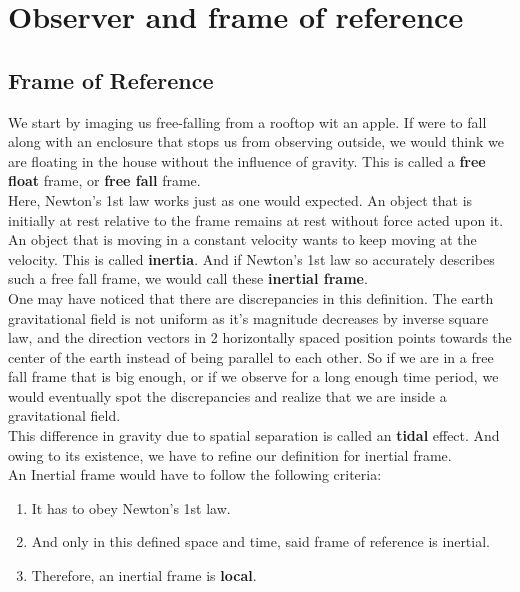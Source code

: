 \documentclass[12pt]{book}
\begin{document}
\section{Observer and frame of reference}

\subsection{Frame of Reference}
We start by imaging us free-falling from a rooftop wit an apple. If were to fall along with an enclosure that stops us from observing outside, we would think we are floating in the house without the influence of gravity. This is called a \textbf{free float} frame, or \textbf{free fall} frame.\\
\newline
Here, Newton's 1st law works just as one would expected. An object that is initially at rest relative to the frame remains at rest without force acted upon it. An object that is moving in a constant velocity wants to keep moving at the velocity. This is called \textbf{inertia}. And if Newton's 1st law so accurately describes such a free fall frame, we would call these \textbf{inertial frame}. 
\\
\newline
One may have noticed that there are discrepancies in this definition. The earth gravitational field is not uniform as it's magnitude decreases by inverse square law, and the direction vectors in 2 horizontally spaced position points towards the center of the earth instead of being parallel to each other. So if we are in a free fall frame that is big enough, or if we observe for a long enough time period, we would eventually spot the discrepancies and realize that we are inside a gravitational field. \\
\newline
This difference in gravity due to spatial separation is called an \textbf{tidal} effect. And owing to its existence, we have to refine our definition for inertial frame. \\
\newline
An Inertial frame would have to follow the following criteria:\\
\begin{enumerate}
    \item It has to obey Newton's 1st law.
    \item And only in this defined space and time, said frame of reference is inertial.
    \item Therefore, an inertial frame is \textbf{local}.
\end{enumerate}
\end{document}
